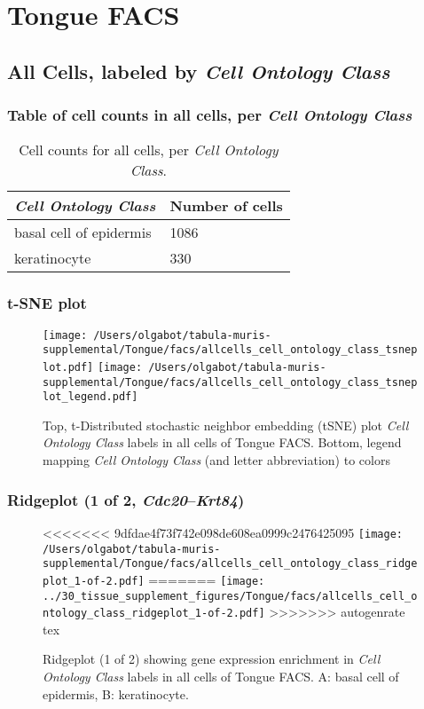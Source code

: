 \clearpage
\section{Tongue FACS}

\subsection{All Cells, labeled by \emph{Cell Ontology Class}}
\subsubsection{Table of cell counts in all cells, per \emph{Cell Ontology Class}}\begin{table}[h]
\centering
\label{my-label}
\begin{tabular}{@{}ll@{}}
\toprule

\emph{Cell Ontology Class}& Number of cells \\ \midrule
basal cell of epidermis & 1086 \\

keratinocyte & 330 \\
\bottomrule
\end{tabular}
\caption{Cell counts for all cells, per \emph{Cell Ontology Class}.}
\end{table}

\clearpage
\subsubsection{t-SNE plot}
\begin{figure}[h]
\centering
\texttt{[image: /Users/olgabot/tabula-muris-supplemental/Tongue/facs/allcells\_cell\_ontology\_class\_tsneplot.pdf]}
\texttt{[image: /Users/olgabot/tabula-muris-supplemental/Tongue/facs/allcells\_cell\_ontology\_class\_tsneplot\_legend.pdf]}
\caption{Top, t-Distributed stochastic neighbor embedding (tSNE) plot  \emph{Cell Ontology Class} labels in all cells of Tongue FACS. Bottom, legend mapping \emph{Cell Ontology Class} (and letter abbreviation) to colors}
\end{figure}


\clearpage

\subsubsection{Ridgeplot (1 of 2, \emph{Cdc20}--\emph{Krt84})}
\begin{figure}[h]
\centering
<<<<<<< 9dfdae4f73f742e098de608ea0999c2476425095
\texttt{[image: /Users/olgabot/tabula-muris-supplemental/Tongue/facs/allcells\_cell\_ontology\_class\_ridgeplot\_1-of-2.pdf]}
=======
\texttt{[image: ../30\_tissue\_supplement\_figures/Tongue/facs/allcells\_cell\_ontology\_class\_ridgeplot\_1-of-2.pdf]}
>>>>>>> autogenrate tex

\caption{ Ridgeplot (1 of 2)  showing gene expression enrichment in \emph{Cell Ontology Class} labels in all cells of Tongue FACS. A: basal cell of epidermis, B: keratinocyte.}
\end{figure}


